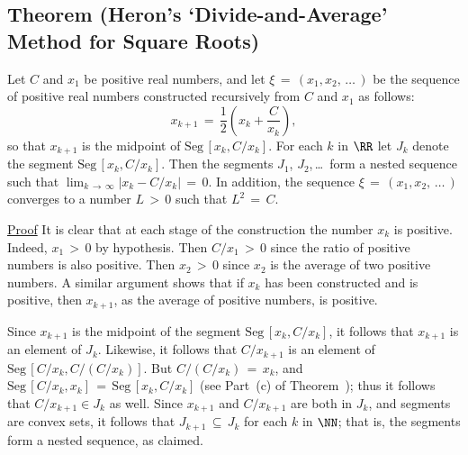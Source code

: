 \VV

            \subsection{\small{\bf Theorem} (Heron's `Divide-and-Average' Method for Square Roots)}
            \label{ThmC20.70}

        Let $C$ and $x_{1}$ be positive real numbers, and let ${\xi} \,=\, (x_{1},x_{2},\,{\ldots}\,)$ be the sequence of positive real numbers constructed recursively from $C$ and $x_{1}$ as follows:
        \begin{equation}
        \label{EqnC.45}
        x_{k+1} \,=\, \frac{1}{2}\left(x_{k} + \frac{C}{x_{k}}\right),
        \end{equation}
    so that $x_{k+1}$ is the midpoint of $\mbox{Seg}\,[x_{k},C/x_{k}]$. For each $k$ in ${\RR}$ let $J_{k}$ denote the segment $\mbox{Seg}\,[x_{k},C/x_{k}]$.
    Then the segments $J_{1}$, $J_{2}$,\,{\ldots}\, form a nested sequence such that $\lim_{k \,{\rightarrow}\, {\infty}} |x_{k}-C/x_{k}| \,=\, 0$.
    In  addition, the sequence ${\xi} \,=\, (x_{1},x_{2},\,{\ldots}\,)$ converges to a number $L\,>\,0$ such that $L^{2} \,=\, C$.

\V

        \underline{Proof} It is clear that at each stage of the construction the number $x_{k}$ is positive.
    Indeed, $x_{1}\,>\,0$ by hypothesis. Then $C/x_{1}\,>\,0$ since the ratio of positive numbers is also positive.
    Then $x_{2}\,>\,0$ since $x_{2}$ is the average of two positive numbers. A similar argument shows that
    if $x_{k}$ has been constructed and is positive, then $x_{k+1}$, as the average of positive numbers, is positive.

        Since $x_{k+1}$ is the midpoint of the segment $\mbox{Seg}\,[x_{k}, C/x_{k}]$, it follows that $x_{k+1}$ is an element of $J_{k}$.
    Likewise, it follows that $C/x_{k+1}$ is an element of $\mbox{Seg}\,[C/x_{k},C/(C/x_{k})]$.
    But $C/(C/x_{k}) \,=\, x_{k}$, and $\mbox{Seg}\,[C/x_{k},x_{k}] \,=\, \mbox{Seg}\,[x_{k}, C/x_{k}]$ (see Part~(c) of Theorem~);
    thus it follows that $C/x_{k+1}{\in}J_{k}$ as well.
    Since $x_{k+1}$ and $C/x_{k+1}$ are both in $J_{k}$, and segments are convex sets,
    it follows that $J_{k+1} \,{\subseteq}\, J_{k}$ for each $k$ in ${\NN}$; that is, the segments form a nested sequence, as claimed.

